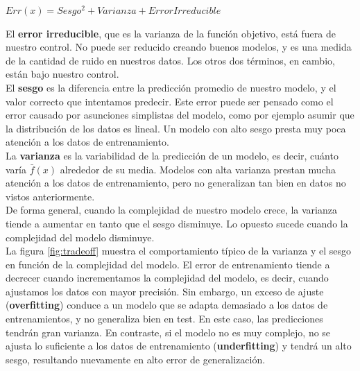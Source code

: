 \begin{center}
$Err(x) =  Sesgo^2 + Varianza + Error Irreducible$
\end{center}



El \textbf{error irreducible}, que es la varianza de la función objetivo, está fuera de nuestro control. No puede ser reducido creando buenos modelos, y es una medida de la cantidad de ruido en nuestros datos. Los otros dos términos, en cambio, están bajo nuestro control.\\

El \textbf{sesgo} es la diferencia entre la predicción promedio de nuestro modelo, y el valor correcto que intentamos predecir. Este error puede ser pensado como el error causado por asunciones simplistas del modelo, como por ejemplo asumir que la distribución de los datos es lineal. Un modelo con alto sesgo presta muy poca atención a los datos de entrenamiento. \\

La \textbf{varianza} es la variabilidad de la predicción de un modelo, es decir, cuánto varía $\bar{f}(x)$ alrededor de su media. Modelos con alta varianza prestan mucha atención a los datos de entrenamiento, pero no generalizan tan bien en datos no vistos anteriormente. \\

De forma general, cuando la complejidad de nuestro modelo crece, la varianza tiende a aumentar en tanto que el sesgo disminuye. Lo opuesto sucede cuando la complejidad del modelo disminuye. \\

La figura \ref{fig:tradeoff} muestra el comportamiento típico de la varianza y el sesgo en función de la complejidad del modelo. El error de entrenamiento tiende a decrecer cuando incrementamos la complejidad del modelo, es decir, cuando ajustamos los datos con mayor precisión. Sin embargo, un exceso de ajuste (\textbf{overfitting}) conduce a un modelo que se adapta demasiado a los datos de entrenamientos, y no generaliza bien en test. En este caso, las predicciones tendrán gran varianza. En contraste, si el modelo no es muy complejo, no se ajusta lo suficiente a los datos de entrenamiento (\textbf{underfitting}) y tendrá un alto sesgo, resultando nuevamente en alto error de generalización.\\ 

